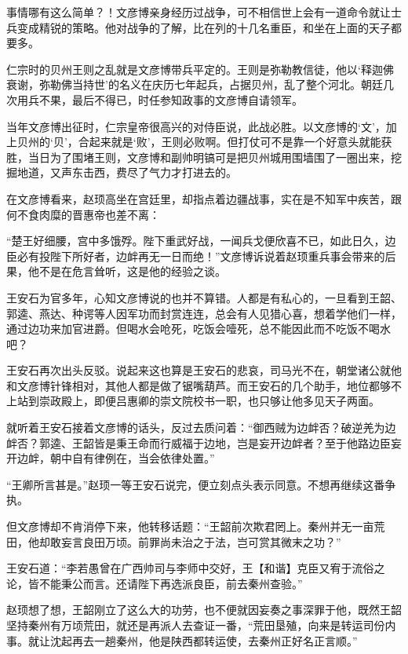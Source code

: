 事情哪有这么简单？！文彦博亲身经历过战争，可不相信世上会有一道命令就让士兵变成精锐的策略。他对战争的了解，比在列的十几名重臣，和坐在上面的天子都要多。

仁宗时的贝州王则之乱就是文彦博带兵平定的。王则是弥勒教信徒，他以‘释迦佛衰谢，弥勒佛当持世’的名义在庆历七年起兵，占据贝州，乱了整个河北。朝廷几次用兵不果，最后不得已，时任参知政事的文彦博自请领军。

当年文彦博出征时，仁宗皇帝很高兴的对侍臣说，此战必胜。以文彦博的‘文’，加上贝州的‘贝’，合起来就是‘败’，王则必败啊。但打仗可不是靠一个好意头就能获胜，当日为了围堵王则，文彦博和副帅明镐可是把贝州城用围墙围了一圈出来，挖掘地道，又声东击西，费尽了气力才打进去的。

在文彦博看来，赵顼高坐在宫廷里，却指点着边疆战事，实在是不知军中疾苦，跟何不食肉糜的晋惠帝也差不离：

“楚王好细腰，宫中多饿殍。陛下重武好战，一闻兵戈便欣喜不已，如此日久，边臣必有投陛下所好者，边衅再无一日而绝！”文彦博诉说着赵顼重兵事会带来的后果，他不是在危言耸听，这是他的经验之谈。

王安石为官多年，心知文彦博说的也并不算错。人都是有私心的，一旦看到王韶、郭逵、燕达、种谔等人因军功而封赏连连，总会有人见猎心喜，想着学他们一样，通过边功来加官进爵。但喝水会呛死，吃饭会噎死，总不能因此而不吃饭不喝水吧？

王安石再次出头反驳。说起来这也算是王安石的悲哀，司马光不在，朝堂诸公就他和文彦博针锋相对，其他人都是做了锯嘴葫芦。而王安石的几个助手，地位都够不上站到崇政殿上，即便吕惠卿的崇文院校书一职，也只够让他多见天子两面。

就听着王安石接着文彦博的话头，反过去质问着：“御西贼为边衅否？破逆羌为边衅否？郭逵、王韶皆是秉王命而行威福于边地，岂是妄开边衅者？至于他路边臣妄开边衅，朝中自有律例在，当会依律处置。”

“王卿所言甚是。”赵顼一等王安石说完，便立刻点头表示同意。不想再继续这番争执。

但文彦博却不肯消停下来，他转移话题：“王韶前次欺君罔上。秦州并无一亩荒田，他却敢妄言良田万顷。前罪尚未治之于法，岂可赏其微末之功？”

王安石道：“李若愚曾在广西帅司与李师中交好，王【和谐】克臣又宥于流俗之论，皆不能秉公而言。还请陛下再选派良臣，前去秦州查验。”

赵顼想了想，王韶刚立了这么大的功劳，也不便就因妄奏之事深罪于他，既然王韶坚持秦州有万顷荒田，就还是再派人去查证一番，“荒田垦殖，向来是转运司份内事。就让沈起再去一趟秦州，他是陕西都转运使，去秦州正好名正言顺。”

